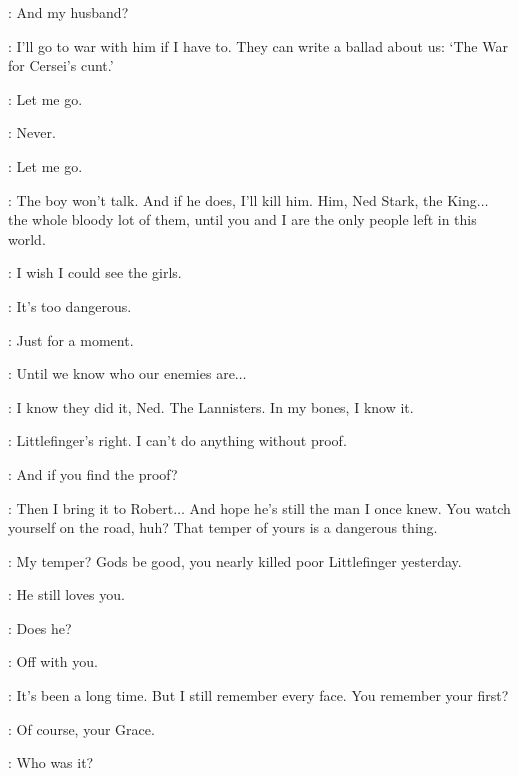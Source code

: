 \CERSEI: And my husband? 

\JAIME: I'll go to war with him if I have to. They can write a ballad about us: `The War for Cersei's cunt.' 


\CERSEI: Let me go. 

\JAIME: Never. 

\CERSEI: Let me go. 

\JAIME: The boy won't talk. And if he does, I'll kill him. Him, Ned Stark, the King$\ldots$ the whole bloody lot of them, until you and I are the only people left in this world. 

\scene



\CATELYN: I wish I could see the girls. 

\NED: It's too dangerous. 

\CATELYN: Just for a moment. 

\NED: Until we know who our enemies are$\ldots$ 

\CATELYN: I know they did it, Ned. The Lannisters. In my bones, I know it. 

\NED: Littlefinger's right. I can't do anything without proof. 

\CATELYN: And if you find the proof? 

\NED: Then I bring it to Robert$\ldots$ And hope he's still the man I once knew. You watch yourself on the road, huh? That temper of yours is a dangerous thing. 

\CATELYN: My temper? Gods be good, you nearly killed poor Littlefinger yesterday. 

\NED: He still loves you. 

\CATELYN: Does he? 

\NED: Off with you. 


\scene



\ROBERT: It's been a long time. But I still remember every face. You remember your first? 

\SELMY: Of course, your Grace. 

\ROBERT: Who was it? 

